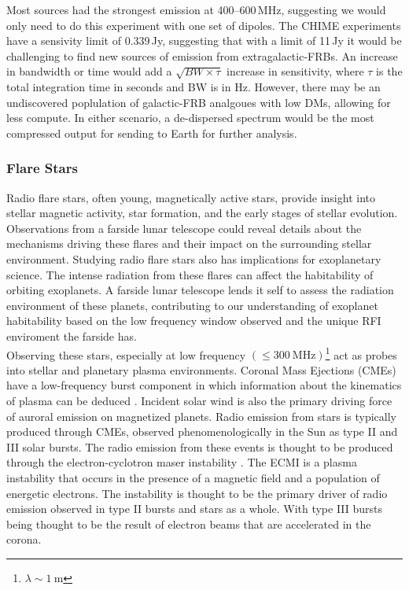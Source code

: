 Most sources had the strongest emission at 400--600\,MHz, suggesting we would only need to do this experiment with one set of dipoles. The CHIME experiments have a sensivity limit of 0.339\,Jy, suggesting that with a limit of 11\,Jy it would be challenging to find new sources of emission from extragalactic-FRBs. An increase in bandwidth or time would add a $\sqrt{BW\times\tau}$ increase in sensitivity, where $\tau$ is the total integration time in seconds and BW is in Hz. However, there may be an undiscovered poplulation of galactic-FRB analgoues with low DMs, allowing for less compute. In either scenario, a de-dispersed spectrum would be the most compressed output for sending to Earth for further analysis.

\subsubsection{Flare Stars}

Radio flare stars, often young, magnetically active stars, provide insight into stellar magnetic activity, star formation, and the early stages of stellar evolution. Observations from a farside lunar telescope could reveal details about the mechanisms driving these flares and their impact on the surrounding stellar environment. Studying radio flare stars also has implications for exoplanetary science. The intense radiation from these flares can affect the habitability of orbiting exoplanets. A farside lunar telescope lends it self to assess the radiation environment of these planets, contributing to our understanding of exoplanet habitability based on the low frequency window observed and the unique RFI enviroment the farside has. \\ 

Observing these stars, especially at low frequency $(\leq 300 \ \text{MHz})$\footnote{$\lambda \sim 1 \ \text{m}$} act as probes into stellar and planetary plasma environments. Coronal Mass Ejections (CMEs) have a low-frequency burst component in which information about the kinematics of plasma can be deduced \citep{villadsen_ultra-wideband_2019}. Incident solar wind is also the primary driving force of auroral emission on magnetized planets. Radio emission from stars is typically produced through CMEs, observed phenomenologically in the Sun as type II and III solar bursts. The radio emission from these events is thought to be produced through the electron-cyclotron maser instability \citep[ECMI;][]{EMI}. The ECMI is a plasma instability that occurs in the presence of a magnetic field and a population of energetic electrons. The instability is thought to be the primary driver of radio emission observed in type II bursts and stars as a whole. With type III bursts being thought to be the result of electron beams that are accelerated in the corona. \\

